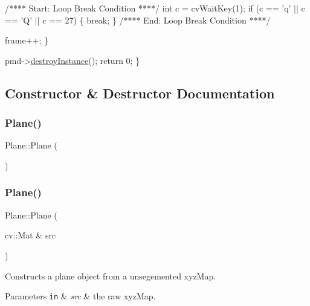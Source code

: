 \begin{DoxyCodeInclude}
        \textcolor{comment}{/**** Start: Loop Break Condition ****/}
        \textcolor{keywordtype}{int} c = cvWaitKey(1);
        \textcolor{keywordflow}{if} (c == \textcolor{charliteral}{'q'} || c == \textcolor{charliteral}{'Q'} || c == 27) \{
            \textcolor{keywordflow}{break};
        \}
        \textcolor{comment}{/**** End: Loop Break Condition ****/}

        frame++;
    \}

    pmd->\hyperlink{class_depth_camera_aaf7c09a863e906f61104f23af10a8597}{destroyInstance}();
    \textcolor{keywordflow}{return} 0;
\}
\end{DoxyCodeInclude}
 

\subsection{Constructor \& Destructor Documentation}
\hypertarget{class_plane_acac0d9c003e0ab10d07b146c3566a0c7}{}\label{class_plane_acac0d9c003e0ab10d07b146c3566a0c7} 
\subsubsection{\texorpdfstring{Plane()}{Plane()}\hspace{0.1cm}{\footnotesize\ttfamily [1/2]}}
{\footnotesize\ttfamily Plane\+::\+Plane (\begin{DoxyParamCaption}{ }\end{DoxyParamCaption})}

\hypertarget{class_plane_a94bc1ca29c305edb76676528b1a9465c}{}\label{class_plane_a94bc1ca29c305edb76676528b1a9465c} 
\subsubsection{\texorpdfstring{Plane()}{Plane()}\hspace{0.1cm}{\footnotesize\ttfamily [2/2]}}
{\footnotesize\ttfamily Plane\+::\+Plane (\begin{DoxyParamCaption}\item[{cv\+::\+Mat \&}]{src }\end{DoxyParamCaption})}



Constructs a plane object from a unsegemented xyz\+Map. 


\begin{DoxyParams}[1]{Parameters}
\mbox{\tt in}  & {\em src} & the raw xyz\+Map. \\
\hline
\end{DoxyParams}
\hypertarget{class_plane_a69abd86051c880dcb44b249ad10c4436}{}\label{class_plane_a69abd86051c880dcb44b249ad10c4436} 
